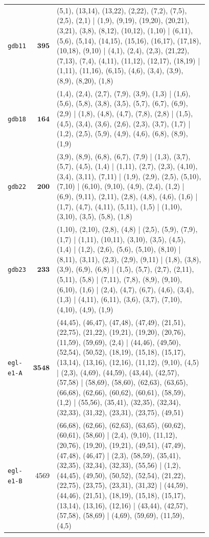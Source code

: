 \begin{landscape}
\begin{longtable}{lr>{\tiny\raggedright\arraybackslash}p{0.78\linewidth}}
\texttt{gdb11} & $\mathbf{395}$ & (5,1), (13,14), (13,22), (2,22), (7,2), (7,5), (2,5), (2,1) | (1,9), (9,19), (19,20), (20,21), (3,21), (3,8), (8,12), (10,12), (1,10) | (6,11), (5,6), (5,14), (14,15), (15,16), (16,17), (17,18), (10,18), (9,10) | (4,1), (2,4), (2,3), (21,22), (7,13), (7,4), (4,11), (11,12), (12,17), (18,19) | (1,11), (11,16), (6,15), (4,6), (3,4), (3,9), (8,9), (8,20), (1,8) \\[2pt]
\texttt{gdb18} & $\mathbf{164}$ & (1,4), (2,4), (2,7), (7,9), (3,9), (1,3) | (1,6), (5,6), (5,8), (3,8), (3,5), (5,7), (6,7), (6,9), (2,9) | (1,8), (4,8), (4,7), (7,8), (2,8) | (1,5), (4,5), (3,4), (3,6), (2,6), (2,3), (3,7), (1,7) | (1,2), (2,5), (5,9), (4,9), (4,6), (6,8), (8,9), (1,9) \\[2pt]
\texttt{gdb22} & $\mathbf{200}$ & (3,9), (8,9), (6,8), (6,7), (7,9) | (1,3), (3,7), (5,7), (4,5), (1,4) | (1,11), (2,7), (2,3), (4,10), (3,4), (3,11), (7,11) | (1,9), (2,9), (2,5), (5,10), (7,10) | (6,10), (9,10), (4,9), (2,4), (1,2) | (6,9), (9,11), (2,11), (2,8), (4,8), (4,6), (1,6) | (1,7), (4,7), (4,11), (5,11), (1,5) | (1,10), (3,10), (3,5), (5,8), (1,8) \\[2pt]
\texttt{gdb23} & $\mathbf{233}$ & (1,10), (2,10), (2,8), (4,8) | (2,5), (5,9), (7,9), (1,7) | (1,11), (10,11), (3,10), (3,5), (4,5), (1,4) | (1,2), (2,6), (5,6), (5,10), (8,10) | (8,11), (3,11), (2,3), (2,9), (9,11) | (1,8), (3,8), (3,9), (6,9), (6,8) | (1,5), (5,7), (2,7), (2,11), (5,11), (5,8) | (7,11), (7,8), (8,9), (9,10), (6,10), (1,6) | (2,4), (4,7), (6,7), (4,6), (3,4), (1,3) | (4,11), (6,11), (3,6), (3,7), (7,10), (4,10), (4,9), (1,9) \\[2pt]
\texttt{egl-e1-A} & $\mathbf{3548}$ & (44,45), (46,47), (47,48), (47,49), (21,51), (22,75), (21,22), (19,21), (19,20), (20,76), (11,59), (59,69), (2,4) | (44,46), (49,50), (52,54), (50,52), (18,19), (15,18), (15,17), (13,14), (13,16), (12,16), (11,12), (9,10), (4,5) | (2,3), (4,69), (44,59), (43,44), (42,57), (57,58) | (58,69), (58,60), (62,63), (63,65), (66,68), (62,66), (60,62), (60,61), (58,59), (1,2) | (55,56), (35,41), (32,35), (32,34), (32,33), (31,32), (23,31), (23,75), (49,51) \\[2pt]
\texttt{egl-e1-B} & 4569 & (66,68), (62,66), (62,63), (63,65), (60,62), (60,61), (58,60) | (2,4), (9,10), (11,12), (20,76), (19,20), (19,21), (49,51), (47,49), (47,48), (46,47) | (2,3), (58,59), (35,41), (32,35), (32,34), (32,33), (55,56) | (1,2), (44,45), (49,50), (50,52), (52,54), (21,22), (22,75), (23,75), (23,31), (31,32) | (44,59), (44,46), (21,51), (18,19), (15,18), (15,17), (13,14), (13,16), (12,16) | (43,44), (42,57), (57,58), (58,69) | (4,69), (59,69), (11,59), (4,5) \\[2pt]

\end{longtable}
\end{landscape}
